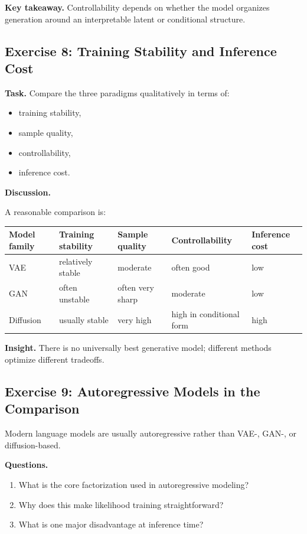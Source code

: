 \medskip

\noindent
\textbf{Key takeaway.}  
Controllability depends on whether the model organizes generation around an interpretable latent or conditional structure.

\subsection{Exercise 8: Training Stability and Inference Cost}

\textbf{Task.}  
Compare the three paradigms qualitatively in terms of:
\begin{itemize}
    \item training stability,
    \item sample quality,
    \item controllability,
    \item inference cost.
\end{itemize}

\medskip

\noindent
\textbf{Discussion.}

A reasonable comparison is:

\begin{center}
\begin{tabular}{|l|l|l|l|l|}
\hline
Model family & Training stability & Sample quality & Controllability & Inference cost \\
\hline
VAE & relatively stable & moderate & often good & low \\
GAN & often unstable & often very sharp & moderate & low \\
Diffusion & usually stable & very high & high in conditional form & high \\
\hline
\end{tabular}
\end{center}

\medskip

\noindent
\textbf{Insight.}  
There is no universally best generative model; different methods optimize different tradeoffs.

\subsection{Exercise 9: Autoregressive Models in the Comparison}

Modern language models are usually autoregressive rather than VAE-, GAN-, or diffusion-based.

\medskip

\noindent
\textbf{Questions.}
\begin{enumerate}
    \item What is the core factorization used in autoregressive modeling?
    \item Why does this make likelihood training straightforward?
    \item What is one major disadvantage at inference time?
\end{enumerate}

